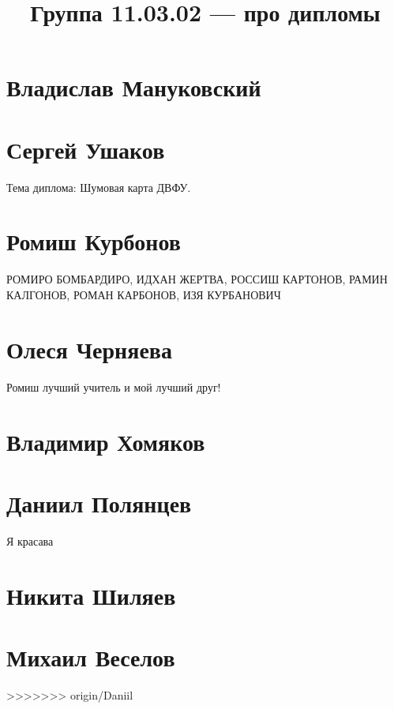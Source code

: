 \documentclass{article}
\title{Группа 11.03.02 --- про дипломы}
\begin{document}
\section*{Владислав Мануковский}

\section*{Сергей Ушаков}

Тема диплома: Шумовая карта ДВФУ.

\section*{Ромиш Курбонов}

РОМИРО БОМБАРДИРО, ИДХАН ЖЕРТВА, РОССИШ КАРТОНОВ, РАМИН КАЛГОНОВ, РОМАН КАРБОНОВ, ИЗЯ КУРБАНОВИЧ

\section*{Олеся Черняева}
Ромиш лучший учитель и мой лучший друг!

\section*{Владимир Хомяков}

\section*{Даниил Полянцев}
Я красава

\section*{Никита Шиляев}

\section*{Михаил Веселов}


>>>>>>> origin/Daniil
\end{document}
